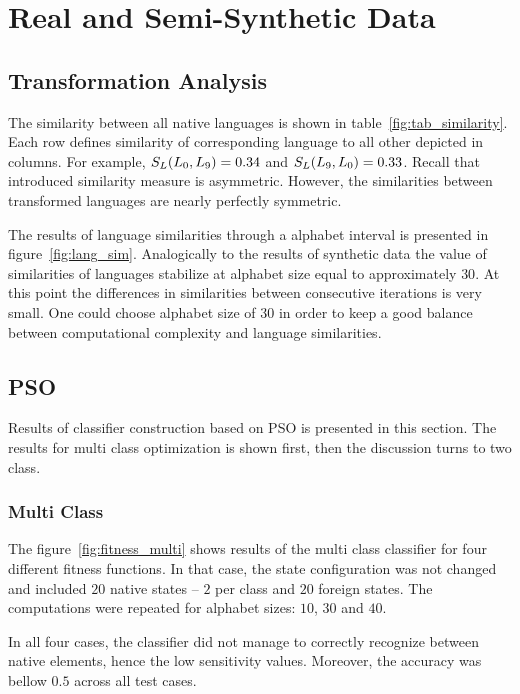 \documentclass{mini}
\begin{document}
\section{Real and Semi-Synthetic Data}

\subsection{Transformation Analysis}

The similarity between all native languages is shown in table~\ref{fig:tab_similarity}. Each row defines similarity of corresponding language to all other depicted in columns. For example, $S_{L}(L_0,L_9) = 0.34$ and $S_{L}(L_9,L_0) = 0.33$. Recall that introduced similarity measure is asymmetric. However, the similarities between transformed languages are nearly perfectly symmetric.

\makeTableMutualSimilarites

The results of language similarities through a alphabet interval is presented in figure~\ref{fig:lang_sim}. Analogically to the results of synthetic data the value of similarities of languages stabilize at alphabet size equal to approximately $30$. At this point the differences in similarities between consecutive iterations is very small. One could choose alphabet size of $30$ in order to keep a good balance between computational complexity and language similarities.

\makeFigureAvgSimlarity


\subsection{PSO}

Results of classifier construction based on PSO is presented in this section. The results for multi class optimization is shown first, then the discussion turns to two class.

\subsubsection{Multi Class}

The figure~\ref{fig:fitness_multi} shows results of the multi class classifier for four different fitness functions. In that case, the state configuration was not changed and included $20$ native states -- $2$ per class and $20$ foreign states. The computations were repeated for alphabet sizes: $10$, $30$ and $40$.

In all four cases, the classifier did not manage to correctly recognize between native elements, hence the low sensitivity values. Moreover, the accuracy was bellow $0.5$ across all test cases. 
\end{document}
